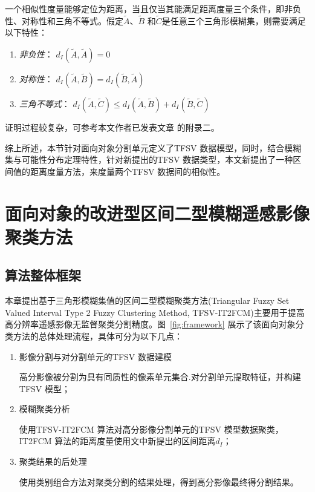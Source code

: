 一个相似性度量能够定位为距离，当且仅当其能满足距离度量三个条件，即非负性、对称性和三角不等式。假定$\tilde{A}$、$\tilde{B}$ 和$\tilde{C}$是任意三个三角形模糊集，则需要满足以下特性：
\begin{enumerate}[(1)]
    \item \textsl{非负性}： $d_I(\tilde{A}, \tilde{A}) = 0$
    \item\textsl{对称性}： $d_I(\tilde{A}, \tilde{B}) = d_I(\tilde{B}, \tilde{A})$
    \item  \textsl{三角不等式}： $d_I(\tilde{A}, \tilde{C}) \leq d_I(\tilde{A}, \tilde{B}) + d_I(\tilde{B}, \tilde{C})$
\end{enumerate}
证明过程较复杂，可参考本文作者已发表文章\cite{jiang2018enhanced} 的附录二。

综上所述，本节针对面向对象分割单元定义了TFSV 数据模型，同时，结合模糊集与可能性分布定理特性，针对新提出的TFSV 数据类型，本文新提出了一种区间值的距离度量方法，来度量两个TFSV 数据间的相似性。


\section{面向对象的改进型区间二型模糊遥感影像聚类方法}
\label{sec::chap03-3}


\subsection{算法整体框架}
\label{subsec::chap03-3}
本章提出基于三角形模糊集值的区间二型模糊聚类方法(Triangular Fuzzy Set Valued Interval Type 2 Fuzzy Clustering Method, TFSV-IT2FCM)主要用于提高高分辨率遥感影像无监督聚类分割精度。图~\ref{fig:framework} 展示了该面向对象分类方法的总体处理流程，具体可分为以下几点：

\begin{enumerate}[Step 1:]
    \item 影像分割与对分割单元的TFSV 数据建模

          高分影像被分割为具有同质性的像素单元集合.对分割单元提取特征，并构建 TFSV 模型；
    \item 模糊聚类分析

          使用TFSV-IT2FCM 算法对高分影像分割单元的TFSV 模型数据聚类，IT2FCM 算法的距离度量使用文中新提出的区间距离$d_I$；
    \item 聚类结果的后处理

          使用类别组合方法对聚类分割的结果处理，得到高分影像最终得分割结果。
\end{enumerate}

